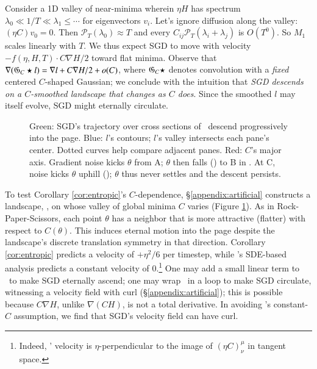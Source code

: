 Consider a 1D valley of near-minima wherein $\eta H$ has spectrum
$\lambda_0 \ll 1/T \ll \lambda_1 \leq \cdots$ for eigenvectors
$v_i$.  Let's ignore diffusion along the valley: $(\eta C) v_0 =
0$.
%
Then ${\mathcal P}_T(\lambda_0)\approx T$ and every
$C_{ij}{\mathcal P}_T(\lambda_i+\lambda_j)$ is $O(T^0)$.  So $M_1$
scales linearly with $T$.  We thus expect SGD to move with
velocity $-f(\eta,H,T)\cdot C\nabla H/2$ toward flat minima.  
Observe that $\nabla ({\frak G}_C \star l) = \nabla l+C\nabla
H/2 + o(C)$, where ${\frak G}_C \star$ denotes convolution with a
\emph{fixed} centered $C$-shaped Gaussian; we conclude with the
intuition that \emph{SGD descends on a $C$-smoothed landscape that
changes as $C$ does}.  Since the smoothed $l$ may itself evolve,
SGD might eternally circulate.

\begin{figure}[h!]
    \squash
    \caption{%
        Green: SGD's trajectory over 
        cross sections of \Helix\ descend progressively
        into the page.  Blue: $l$'s contours; $l$'s valley
        intersects each pane's center.  Dotted
        curves help compare adjacent panes.
        Red: %
        $C$'s
        major axis.
        Gradient noise kicks $\theta$ from A; $\theta$ then falls
        (\hspace{-0.12cm}\protect{}) to B in {\hspace{-0.08cm}\protect{}}.  At C,
        noise kicks $\theta$ uphill (\hspace{-0.08cm}\protect{}); $\theta$
        thus never settles and the descent persists.
    }
    \squash\squash
    \label{fig:archimedes}
\end{figure}

To test Corollary \ref{cor:entropic}'s $C$-dependence,
\S\ref{appendix:artificial} constructs a landscape, \Helix, on
whose valley of global minima $C$ varies (Figure
\ref{fig:archimedes}).  As in Rock-Paper-Scissors, each point
$\theta$ has a neighbor that is more attractive (flatter) with
respect to $C(\theta)$.  This induces eternal motion into the page
despite the landscape's discrete translation symmetry in that
direction.  Corollary \ref{cor:entropic} predicts a velocity of
$+\eta^2/6$ per timestep, while \cite{ch18}'s SDE-based analysis
predicts a constant velocity of $0$.\footnote{
    Indeed, \Helix' velocity is $\eta$-perpendicular to the image
    of $(\eta C)^\mu_\nu$ in tangent space.
}
One may add a small linear term to \Helix\ to make SGD eternally
ascend; one may wrap \Helix\ in a loop to make SGD circulate,
witnessing a velocity field with curl (\S\ref{appendix:artificial});
this is
possible because $C\nabla H$, unlike $\nabla(CH)$, is not a total
derivative. 
In avoiding \cite{we19b}'s constant-$C$ assumption, we 
find that SGD's velocity field can have curl. 

